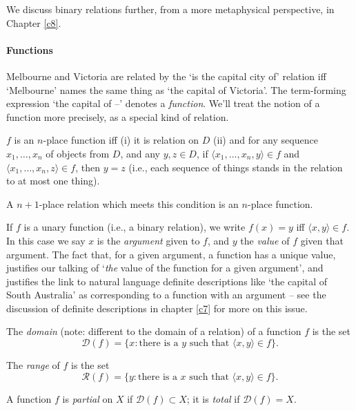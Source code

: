 We discuss binary relations further, from a more metaphysical perspective, in Chapter \ref{c8}.

\paragraph{Functions}

Melbourne and Victoria are related by the `is the capital city of' relation iff `Melbourne' names the same thing as `the capital of Victoria'. The term-forming expression `the capital of  –' denotes a \emph{function}. We'll treat the notion of a function more precisely, as a special kind of relation.
\begin{definition}[Function]
	$f$ is an $n$-place function iff (i) it is relation on $D$ (ii) and for any sequence $x_{1},\ldots,x_{n}$ of objects from $D$, and any $y,z \in D$, if $\langle x_{1},\ldots,x_{n},y\rangle \in f$ and $\langle x_{1},\ldots,x_{n},z\rangle \in f$, then $y=z$ (i.e., each sequence of things stands in the relation to at most one thing). 
\end{definition}
 A $n+1$-place relation which meets this condition is an $n$-place function.

If $f$ is a unary function (i.e., a binary relation), we write $f(x) = y$ iff $\langle x,y\rangle \in f$. In this case we say $x$ is the \emph{argument} given to $f$, and $y$ the \emph{value} of $f$ given that argument. The fact that, for a given argument, a function has a unique value, justifies our talking of `\emph{the} value of the function for a given argument', and justifies the link to natural language definite descriptions like `the capital of South Australia' as corresponding to a function with an argument – see the discussion of definite descriptions in chapter \ref{c7} for more on this issue.
\begin{definition}[Domain]
The \emph{domain} (note: different to the domain of a relation) of a function  $f$ is the set $$\mathcal{D}(f)=\{x: \text{there is a $y$ such that } \langle x,y \rangle \in f\}.$$
\end{definition}
\begin{definition}[Range]
	The \emph{range} of $f$ is the set $$\mathcal{R}(f)=\{y: \text{there is a $x$ such that } \langle x,y \rangle \in f\}.$$
\end{definition}
\begin{definition}
	A function
$f$ is \emph{partial}  on $X$ if $\mathcal{D}(f) \subset X$; it is \emph{total} if $\mathcal{D}(f) =X$.
\end{definition}

